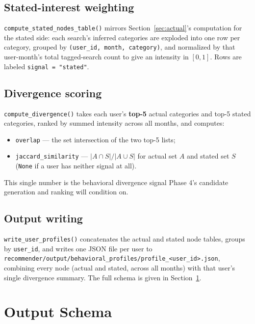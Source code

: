 \documentclass[11pt,a4paper]{article}
\newcommand{\code}[1]{\texttt{#1}}
\begin{document}
\subsection{Stated-interest weighting}

\code{compute\_stated\_nodes\_table()} mirrors Section~\ref{sec:actual}'s computation for the
stated side: each search's inferred categories are exploded into one row per category, grouped by
\code{(user\_id, month, category)}, and normalized by that user-month's total tagged-search count
to give an intensity in $[0,1]$. Rows are labeled \code{signal = "stated"}.

\subsection{Divergence scoring}
\label{sec:divergence}

\code{compute\_divergence()} takes each user's \textbf{top-5} actual categories and top-5 stated
categories, ranked by summed intensity across all months, and computes:

\begin{itemize}
    \item \code{overlap} --- the set intersection of the two top-5 lists;
    \item \code{jaccard\_similarity} --- $|A \cap S| / |A \cup S|$ for actual set $A$ and stated
        set $S$ (\code{None} if a user has neither signal at all).
\end{itemize}

This single number is the behavioral divergence signal Phase 4's candidate generation and ranking
will condition on.

\subsection{Output writing}

\code{write\_user\_profiles()} concatenates the actual and stated node tables, groups by
\code{user\_id}, and writes one JSON file per user to
\code{recommender/output/behavioral\_profiles/profile\_<user\_id>.json}, combining every node
(actual and stated, across all months) with that user's single divergence summary. The full
schema is given in Section~\ref{sec:schema}.

\newpage
\section{Output Schema}
\label{sec:schema}
\end{document}
